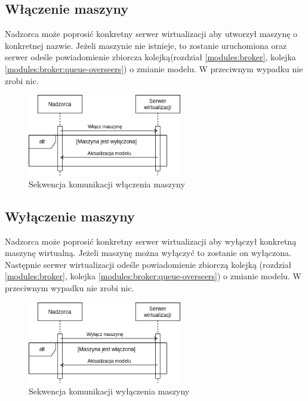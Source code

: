 \documentclass[../opis-rozwiazania.tex]{subfiles}
\begin{document}
\subsection{Włączenie maszyny}

Nadzorca może poprosić konkretny serwer wirtualizacji aby utworzył maszynę o konkretnej nazwie.
Jeżeli maszynie nie istnieje, to zostanie uruchomiona oraz serwer odeśle powiadomienie zbiorcza kolejką(rozdział \ref{modules:broker}, kolejka \ref{modules:broker:queue-overseers}) o zmianie modelu.
W przeciwnym wypadku nie zrobi nic.

\begin{figure}[H]
    \centering
    \includegraphics[width=0.6\textwidth]{../diagrams/sequence_diagrams/wlaczenie_maszyny.png}
    \caption{Sekwencja komunikacji włączenia maszyny}
    \label{figure:diagrams:sequence_diagrams:wlaczenie_maszyny}
\end{figure}

\subsection{Wyłączenie maszyny}

Nadzorca może poprosić konkretny serwer wirtualizacji aby wyłączył konkretną maszynę wirtualną.
Jeżeli maszynę można wyłączyć to zostanie on wyłączona.
Następnie serwer wirtualizacji odeśle powiadomienie zbiorczą kolejką (rozdział \ref{modules:broker}, kolejka \ref{modules:broker:queue-overseers}) o zmianie modelu.
W przeciwnym wypadku nie zrobi nic.

\begin{figure}[H]
    \centering
    \includegraphics[width=0.6\textwidth]{../diagrams/sequence_diagrams/wylaczenie_maszyny.png}
    \caption{Sekwencja komunikacji wyłączenia maszyny}
    \label{figure:diagrams:sequence_diagrams:wylaczenie_maszyny}
\end{figure}
\end{document}
